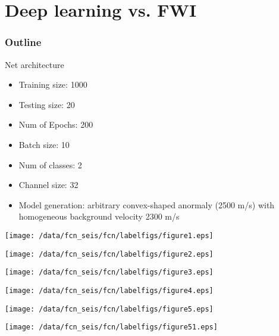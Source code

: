 \documentclass[aspectratio=43]{beamer}
\begin{document}
\section{Deep learning vs. FWI}
\begin{frame}
\frametitle{Outline}
\tableofcontents[currentsection]
\end{frame}

\begin{frame}{Net architecture}
\begin{itemize}
\item{Training size: 1000}
\item{Testing size: 20}
\item{Num of Epochs: 200}
\item{Batch size: 10}
\item{Num of classes: 2}
\item{Channel size: 32}
\item{Model generation: arbitrary convex-shaped anormaly (2500 m/s) with homogeneous background velocity 2300 m/s}
\end{itemize}
\end{frame}
\begin{frame}{}
 \centering
 \texttt{[image: /data/fcn\_seis/fcn/labelfigs/figure1.eps]}
\end{frame}
\begin{frame}{}
 \centering
 \texttt{[image: /data/fcn\_seis/fcn/labelfigs/figure2.eps]}
\end{frame}
\begin{frame}{}
 \centering
 \texttt{[image: /data/fcn\_seis/fcn/labelfigs/figure3.eps]}
\end{frame}
\begin{frame}{}
 \centering
 \texttt{[image: /data/fcn\_seis/fcn/labelfigs/figure4.eps]}
\end{frame}
\begin{frame}{}
 \centering
 \texttt{[image: /data/fcn\_seis/fcn/labelfigs/figure5.eps]}
\end{frame}
\begin{frame}{}
 \centering
 \texttt{[image: /data/fcn\_seis/fcn/labelfigs/figure51.eps]}
\end{frame}
\end{document}
